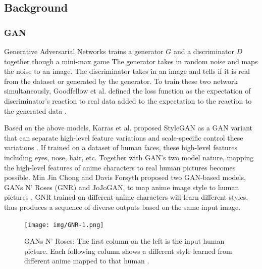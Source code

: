 \subsection*{Background}

\subsubsection*{GAN}

Generative Adversarial Networks trains a generator $G$ and a discriminator $D$ together though a mini-max game
The generator takes in random noise and maps the noise to an image.
The discriminator takes in an image and tells if it is real from the dataset or generated by the generator.
To train these two network simultaneously, Goodfellow et al. defined the loss function as 
the expectation of discriminator's reaction to real data added to 
the expectation to the reaction to the generated data \cite{Goodfellow2020Generative}.

\par
Based on the above models, Karras et al. proposed StyleGAN as 
a GAN variant that can separate high-level feature variations and scale-specific control these variations \cite{Karras2019Style}.
If trained on a dataset of human faces, these high-level features including eyes, nose, hair, etc.
Together with GAN's two model nature, mapping the high-level features of anime characters to real human pictures becomes possible.
Min Jin Chong and Davis Forsyth proposed two GAN-based models,
GANs N' Roses (GNR) and JoJoGAN,
to map anime image style to human pictures \cite{chong2021gans,chong2021jojogan}.
GNR trained on different anime characters will learn different styles,
thus produces a sequence of diverse outputs based on the same input image.
\begin{figure}[h]
    \texttt{[image: img/GNR-1.png]}
    \caption{
        GANs N' Roses: The first column on the left is the input human picture.
        Each following column shows a different style learned from different anime mapped to that human \cite{chong2021gans}.
    }
\end{figure}

